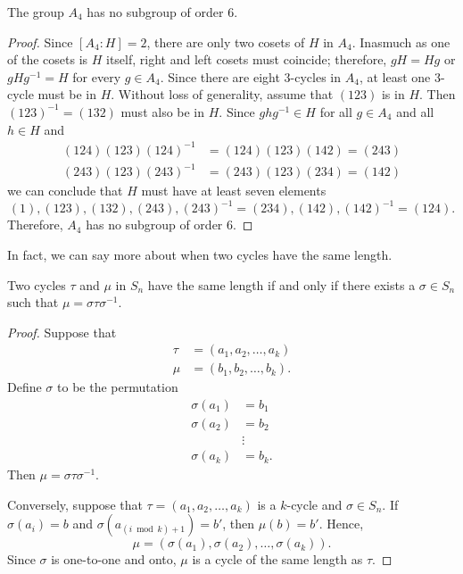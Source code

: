 \begin{proposition}\label{cosets_theorem_10}
The group $A_4$ has no subgroup of order 6.
\end{proposition}

\begin{proof}
Since $[A_4 : H] = 2$, there are only two cosets of $H$ in $A_4$.  Inasmuch as one of the cosets is $H$ itself, right and left cosets must coincide; therefore, $gH = Hg$ or $g H g^{-1} = H$ for every $g \in A_4$. 
Since there are eight 3-cycles in $A_4$, at least one 3-cycle must be in $H$.  Without loss of generality, assume that $(123)$ is in $H$.  Then $(123)^{-1} = (132)$ must also be in $H$.  Since $g h g^{-1} \in H$ for all $g \in A_4$ and all $h \in H$ and
\begin{align*}
(124)(123)(124)^{-1} & = (124)(123)(142)  = (243) \\
(243)(123)(243)^{-1} & = (243)(123)(234)  = (142)
\end{align*}
we can conclude that $H$ must have at least seven elements
\[
(1), (123), (132), (243), (243)^{-1} = (234), (142), (142)^{-1} = (124).
\]
Therefore, $A_4$ has no subgroup of order 6.
\hspace*{1in}
\end{proof}

\medskip

In fact, we can say more about when two cycles have the same length.


\begin{theorem}\label{cosets:cycle_length_theorem}
Two cycles $\tau$ and $\mu$ in $S_n$ have the same length if and only if there exists a $\sigma \in S_n$ such that $\mu = \sigma \tau \sigma^{-1}$.  
\end{theorem}
 
\begin{proof}
Suppose that
\begin{align*}
\tau & = (a_1, a_2, \ldots, a_k ) \\
\mu  & = (b_1, b_2, \ldots, b_k ).
\end{align*}
Define $\sigma$ to be the permutation
\begin{align*}
\sigma( a_1 ) & = b_1 \\
\sigma( a_2 ) & = b_2 \\
& \vdots   \\
\sigma( a_k ) & = b_k.
\end{align*}
Then $\mu = \sigma \tau \sigma^{-1}$.

Conversely, suppose that $\tau = (a_1, a_2, \ldots, a_k )$ is a $k$-cycle and $\sigma \in S_n$. If $\sigma( a_i ) = b$ and $\sigma( a_{(i \bmod k) + 1} ) = b'$, then $\mu( b) = b'$.  Hence, 
\[
\mu = ( \sigma(a_1), \sigma(a_2), \ldots, \sigma(a_k) ).
\]
Since $\sigma$ is one-to-one and onto, $\mu$ is a cycle of the same length as $\tau$. 
\end{proof}

